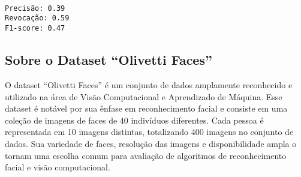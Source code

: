 \documentclass[11pt]{article}
\begin{document}
    \begin{center}
    \end{center}
    { \hspace*{\fill} \\}
    
    \begin{center}
    \end{center}
    { \hspace*{\fill} \\}
    
    \begin{center}
    \end{center}
    { \hspace*{\fill} \\}
    
    \begin{Verbatim}[commandchars=\\\{\}]
Precisão: 0.39
Revocação: 0.59
F1-score: 0.47
    \end{Verbatim}

    \hypertarget{sobre-o-dataset-olivetti-faces}{%
\subsection{Sobre o Dataset ``Olivetti
Faces''}\label{sobre-o-dataset-olivetti-faces}}

O dataset ``Olivetti Faces'' é um conjunto de dados amplamente
reconhecido e utilizado na área de Visão Computacional e Aprendizado de
Máquina. Esse dataset é notável por sua ênfase em reconhecimento facial
e consiste em uma coleção de imagens de faces de 40 indivíduos
diferentes. Cada pessoa é representada em 10 imagens distintas,
totalizando 400 imagens no conjunto de dados. Sua variedade de faces,
resolução das imagens e disponibilidade ampla o tornam uma escolha comum
para avaliação de algoritmos de reconhecimento facial e visão
computacional.
\end{document}
